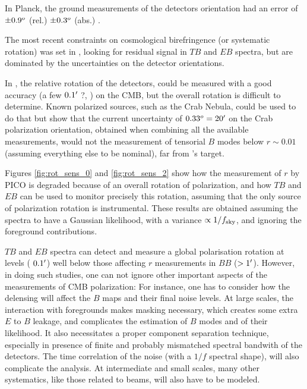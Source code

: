 \documentclass[PICOReport.tex]{subfiles}
\begin{document}
In Planck, the ground measurements of the detectors orientation had an error of $\pm 0.9^o$ (rel.) $\pm 0.3^o$ (abs.) \citep{Rosset+2010}.

The most recent constraints on cosmological birefringence (or systematic rotation) was set in \citet{Planck2016_XLIX}, looking for residual signal in $TB$ and $EB$ spectra, but are dominated by the uncertainties on the detector orientations.

In \pico, the relative rotation of the detectors, could be measured with a good accuracy (a few $0.1'$ ?, ) on the CMB, but the overall rotation is difficult to determine.
Known polarized sources, such as the Crab Nebula, could be used to do that but \citet{Aumont+2018} show that the current uncertainty of $0.33^o = 20'$ on the Crab polarization orientation, obtained when combining all the available measurements, 
would not the measurement of tensorial $B$ modes below $r \sim 0.01$ (assuming everything else to be nominal), far from \pico's target.

Figures \ref{fig:rot_sens_0} and \ref{fig:rot_sens_2} show how the measurement of $r$ by PICO is degraded because of an overall rotation of polarization, and how $TB$ and $EB$ can be used to monitor precisely this rotation, assuming that the only source of polarization rotation is instrumental.
These results are obtained assuming the spectra to have a Gaussian likelihood, with a variance $\propto 1/f_{\rm sky}$, and ignoring the foreground contributions.



$TB$ and $EB$ spectra can detect and measure a global polarisation rotation at levels ($~0.1 '$) well below those affecting $r$ measurements in $BB$ ($> 1 '$).
However, in doing such studies, one can not ignore other important aspects of the measurements of CMB polarization:
For instance, one has to consider how the delensing will affect the $B$ maps and their final noise levels.
At large scales, the interaction with foregrounds makes masking necessary, which creates some extra $E$ to $B$ leakage, and complicates the estimation of $B$ modes and of their likelihood. It also necessitates a proper component separation technique, especially in presence of finite and probably mismatched spectral bandwith of the detectors.
The time correlation of the noise (with a $1/f$ spectral shape), will also complicate the analysis.
At intermediate and small scales, many other systematics, like those related to beams, will also have to be modeled.
\end{document}
